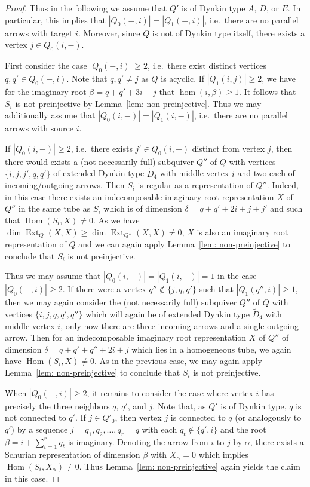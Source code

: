 \documentclass{amsart}
\numberwithin{equation}{section}
\newcommand{\Ext}{\operatorname{Ext}}
\newcommand{\Hom}{\operatorname{Hom}}
\begin{document}
\begin{proof}
  Thus in the following we assume that $Q'$ is of Dynkin type $A$, $D$, or $E$.
  In particular, this implies that $|Q_0(-,i)|=|Q_1(-,i)|$, i.e.~there are no parallel arrows with target $i$.
  Moreover, since $Q$ is not of Dynkin type itself, there exists a vertex $j\in Q_0(i,-)$.  
	
  First consider the case $|Q_0(-,i)|\geq 2$, i.e.~there exist distinct vertices $q,q'\in Q_0(-,i)$.
  Note that $q,q'\neq j$ as $Q$ is acyclic. 
  If $|Q_1(i,j)|\geq 2$, we have for the imaginary root $\beta=q+q'+3i+j$ that $\hom(i,\beta)\geq 1$.
  It follows that $S_i$ is not preinjective by Lemma~\ref{lem: non-preinjective}.
  Thus we may additionally assume that $|Q_0(i,-)|=|Q_1(i,-)|$, i.e.~there are no parallel arrows with source $i$.

  If $|Q_0(i,-)|\ge2$, i.e.~there exists $j'\in Q_0(i,-)$ distinct from vertex $j$, then there would exists a (not necessarily full) subquiver $Q''$ of $Q$ with vertices $\{i,j,j',q,q'\}$ of extended Dynkin type $\tilde D_4$ with middle vertex $i$ and two each of incoming/outgoing arrows.
  Then $S_i$ is regular as a representation of $Q''$.
  Indeed, in this case there exists an indecomposable imaginary root representation $X$ of $Q''$ in the same tube as $S_i$ which is of dimension $\delta=q+q'+2i+j+j'$ and such that $\Hom(S_i,X)\neq 0$.
  As we have $\dim\Ext_Q(X,X)\geq\dim\Ext_{Q''}(X,X)\neq 0$, $X$ is also an imaginary root representation of $Q$ and we can again apply Lemma~\ref{lem: non-preinjective} to conclude that $S_i$ is not preinjective.

  Thus we may assume that $|Q_0(i,-)|=|Q_1(i,-)|=1$ in the case $|Q_0(-,i)|\ge2$.
  If there were a vertex $q''\notin \{j,q,q'\}$ such that $|Q_1(q'',i)|\geq 1$, then we may again consider the (not necessarily full) subquiver $Q''$ of $Q$ with vertices $\{i,j,q,q',q''\}$ which will again be of extended Dynkin type $\tilde D_4$ with middle vertex $i$, only now there are three incoming arrows and a single outgoing arrow.
  Then for an indecomposable imaginary root representation $X$ of $Q''$ of dimension $\delta=q+q'+q''+2i+j$ which lies in a homogeneous tube, we again have $\Hom(S_i,X)\neq 0$.
  As in the previous case, we may again apply Lemma~\ref{lem: non-preinjective} to conclude that $S_i$ is not preinjective.

  When $|Q_0(-,i)|\ge2$, it remains to consider the case where vertex $i$ has precisely the three neighbors $q$, $q'$, and $j$.
  Note that, as $Q'$ is of Dynkin type, $q$ is not connected to $q'$.
  If $j\in Q'_0$, then vertex $j$ is connected to $q$ (or analogously to $q'$) by a sequence $j=q_1,q_2,\ldots,q_r=q$ with each $q_t\notin\{q',i\}$ and the root $\beta=i+\sum_{t=1}^r q_t$ is imaginary.
  Denoting the arrow from $i$ to $j$ by $\alpha$, there exists a Schurian representation of dimension $\beta$ with $X_\alpha=0$ which implies $\Hom(S_i,X_\alpha)\neq 0$. 
  Thus Lemma~\ref{lem: non-preinjective} again yields the claim in this case.


\end{proof}
\end{document}
